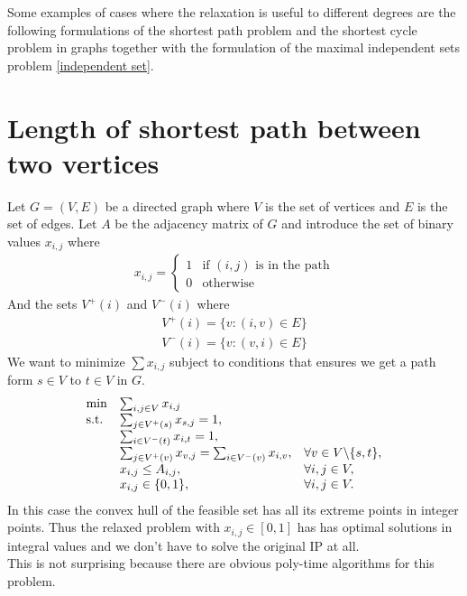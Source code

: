 \begin{example}
Some examples of cases where the relaxation is useful to different degrees are the following formulations of the shortest path problem and the shortest cycle problem in graphs together with the formulation of the maximal independent sets problem \ref{independent set}.
\section{Length of shortest path between two vertices}
Let $G=(V,E)$ be a directed graph where $V$ is the set of vertices and $E$ is the set of edges. Let $A$ be the adjacency matrix of $G$ and introduce the set of binary values $x_{i,j}$ where
\begin{align*}
x_{i,j} = \left\{
\begin{array}{ll}
1 & \text{if } (i,j) \text{ is in the path} \\ 0 & \text{otherwise}
\end{array}\right.
\end{align*}
And the sets $V^+(i)$ and $V^-(i)$ where
\begin{align*}
V^+(i) = \{v: (i,v) \in E\}\\
V^-(i) = \{v: (v, i) \in E\}
\end{align*}
We want to minimize $\sum x_{i,j}$ subject to conditions that ensures we get a path form $s \in V$ to $t \in V$ in $G$.
\begin{align}
\begin{array}{ll@{}ll}
\text{min} &\sum_{i,j \in V}x_{i,j}&\\
\text{s.t.} &\sum_{j\in V^+(s)}x_{s,j} = 1,&\\
&\sum_{i\in V^-(t)}x_{i,t} = 1,&\\
&\sum_{j\in V^+(v)}x_{v,j} = \sum_{i\in V^-(v)}x_{i,v}, \quad &\forall v \in V \backslash \{s,t\},\\
&x_{i,j}\leq A_{i,j},&\forall i,j \in V,\\
&x_{i,j} \in \{0,1\},&\forall i,j \in V.\\
\end{array}
\end{align}
In this case the convex hull of the feasible set has all its extreme points in integer points. Thus the relaxed problem with $x_{i,j} \in [0,1]$ has has optimal solutions in integral values and we don't have to solve the original IP at all.\\
This is not surprising because there are obvious poly-time algorithms for this problem.

\end{example}
